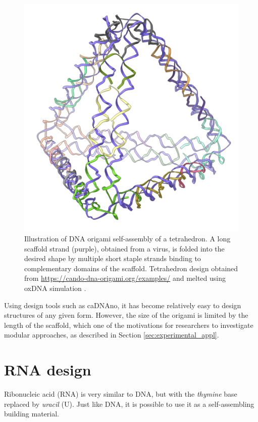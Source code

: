 \begin{figure}
    \centering\includegraphics[width=\textwidth/3]{figures/melt/assembled.png}
    \caption{Illustration of DNA origami self-assembly of a tetrahedron. A long scaffold strand (purple), obtained from a virus, is folded into the desired shape by multiple short staple strands binding to complementary domains of the scaffold. Tetrahedron design obtained from \url{https://cando-dna-origami.org/examples/} and melted using oxDNA simulation \cite{ouldridge2010dna}.
    }
    \label{fig:dnaOrigami}
\end{figure}

Using design tools such as caDNAno\cite{cadnano}, it has become relatively easy to design structures of any given form. However, the size of the origami is limited by the length of the scaffold, which one of the motivations for researchers to investigate modular approaches, as described in Section \ref{sec:experimental_appl}.

\section{RNA design}
\label{sec:RNA_design}
Ribonucleic acid (RNA) is very similar to DNA, but with the \emph{thymine} base replaced by \emph{uracil} (U). Just like DNA, it is possible to use it as a self-assembling building material.

